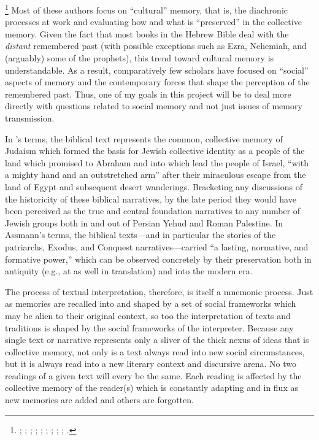     \footnote{%
        \Cite{benzvi_st2017};
        \cite{benzvi_bautch-knoppers2015};
        \cite{benzvi_edelman-benzvi2013};
        \cite{hendel2005};
        \cite{hendel_jbl2001};
        \cite{wilson2017};
        \cite{pioske2018};
        \cite{pioske_bibint2015};
        \cite{pioske2015};
        \cite{smith_cbq2002}.}
Most of these authors focus on ``cultural'' memory, that is, the diachronic processes at work and evaluating how and what is ``preserved'' in the collective memory. Given the fact that most books in the Hebrew Bible deal with the \emph{distant} remembered past (with possible exceptions such as Ezra, Nehemiah, and (arguably) some of the prophets), this trend toward cultural memory is understandable. As a result, comparatively few scholars have focused on ``social'' aspects of memory and the contemporary forces that shape the perception of the remembered past. Thus, one of my goals in this project will be to deal more directly with questions related to social memory and not just issues of memory transmission.

In \halbwachs's terms, the biblical text represents the common, collective memory of \secondtemple Judaism which formed the basis for Jewish collective identity as a people of the land which \yahweh promised to Abraham and into which \yahweh lead the people of Israel, ``with a mighty hand and an outstretched arm'' after their miraculous escape from the land of Egypt and subsequent desert wanderings. Bracketing any discussions of the historicity of these biblical narratives, by the late \secondtemple period they would have been perceived as the true and central foundation narratives to any number of Jewish groups both in and out of Persian Yehud and Roman Palestine. In Assmann's terms, the biblical texts---and in particular the stories of the patriarchs, Exodus, and Conquest narratives---carried ``a lasting, normative, and formative power,''%
    \autocite[38]{assmann2011}
which can be observed concretely by their preservation both in antiquity (e.g., at \qumran as well in translation) and into the modern era.  

The process of textual interpretation, therefore, is itself a mnemonic process. Just as memories are recalled into and shaped by a set of social frameworks which may be alien to their original context, so too the interpretation of texts and traditions is shaped by the social frameworks of the interpreter. Because any single text or narrative represents only a sliver of the thick nexus of ideas that is collective memory, not only is a text always read into new social circumstances, but it is always read into a new literary context and discursive arena. No two readings of a given text will every be the same. Each reading is affected by the collective memory of the reader(s) which is constantly adapting and in flux as new memories are added and others are forgotten.  

